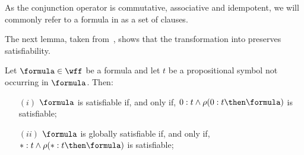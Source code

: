 As the conjunction operator is commutative, associative and idempotent, we will
commonly refer to a formula in  as a set of clauses.

The next lemma, taken from~\cite{nalon2015modal}, shows that the transformation
into  preserves satisfiability.

\begin{lemma}
    Let $\formula \in \wff$ be a formula and let $t$ be a propositional symbol
    not occurring in $\formula$. Then: 
    \begin{enumerate}
        \item[$(i)$] $\formula$ is satisfiable if, and only if, $0 : t \land \rho(0 : t \then \formula)$ is satisfiable;
        \item[$(ii)$] $\formula$ is globally satisfiable if, and only if, $* : t \land \rho(* : t \then \formula)$ is satisfiable;
    \end{enumerate}
\end{lemma}
